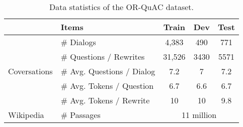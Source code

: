 \begin{table}[t]\label{tab:data}
  \centering
  \caption{Data statistics of the OR-QuAC dataset.}
    \begin{tabular}{llccc}
    \toprule
          & Items & Train & Dev   & Test \\
    \midrule
    \multirow{5}[2]{*}{Coversations} & \# Dialogs & 4,383 & 490   & 771 \\
          & \# Questions / Rewrites & 31,526 & 3430  & 5571 \\
          & \# Avg. Questions / Dialog & 7.2   & 7     & 7.2 \\
          & \# Avg. Tokens / Question & 6.7   & 6.6   & 6.7 \\
          & \# Avg. Tokens / Rewrite & 10    & 10    & 9.8 \\
    \midrule
    Wikipedia  & \# Passages & \multicolumn{3}{c}{11 million} \\
    \bottomrule
    \end{tabular}%
  \label{tab:dataset}%
\end{table}%

